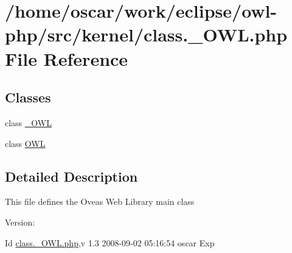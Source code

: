 \hypertarget{class_8__OWL_8php}{
\section{/home/oscar/work/eclipse/owl-php/src/kernel/class.\_\-OWL.php File Reference}
\label{class_8__OWL_8php}
}
\subsection*{Classes}
\begin{CompactItemize}
\item 
class \hyperlink{class__OWL}{\_\-OWL}
\item 
class \hyperlink{classOWL}{OWL}
\end{CompactItemize}


\subsection{Detailed Description}
This file defines the Oveas Web Library main class \begin{Desc}
\item[Version:]\end{Desc}
\begin{Desc}
\item[Id]\hyperlink{class_8__OWL_8php}{class.\_\-OWL.php},v 1.3 2008-09-02 05:16:54 oscar Exp \end{Desc}
